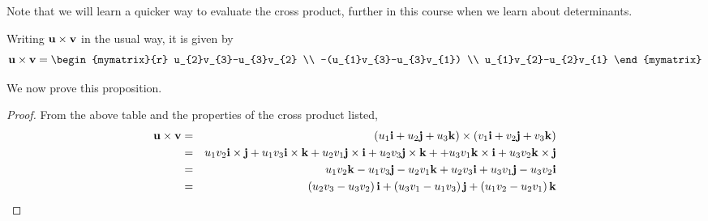 Note that we will learn a quicker way to evaluate the cross product, further in this course when we learn about determinants.

Writing ${\bf u} \times {\bf v}$ in the usual way, it is given by 
\begin{equation*}
\vect{u} \times \vect{v}
=
\begin{mymatrix}{r}
 u_{2}v_{3}-u_{3}v_{2} \\
-(u_{1}v_{3}-u_{3}v_{1}) \\
 u_{1}v_{2}-u_{2}v_{1}
\end{mymatrix}
\end{equation*}

We now prove this proposition. 

\begin{proof} From the above table and the properties of the cross
product listed,
\begin{eqnarray*}
{\bf u} \times {\bf v} &=& \left( u_{1}{\bf i}+u_{2}{\bf j}+u_{3}{\bf k}\right) \times \left(
v_{1}{\bf i}+v_{2}{\bf j}+v_{3}{\bf k}\right) \\
&=& u_{1}v_{2}{\bf i}\times {\bf j}+u_{1}v_{3}{\bf i}\times {\bf k}+u_{2}v_{1}{\bf j}\times {\bf i}+
u_{2}v_{3}{\bf j}\times {\bf k}+
+u_{3}v_{1}{\bf k}\times {\bf i}+u_{3}v_{2}{\bf k}\times {\bf j} \\
&=&u_{1}v_{2}{\bf k}-u_{1}v_{3}{\bf j}-u_{2}v_{1}{\bf k}+u_{2}v_{3}
{\bf i}+u_{3}v_{1}{\bf j}-u_{3}v_{2}{\bf i} \\
&=&\left( u_{2}v_{3}-u_{3}v_{2}\right) {\bf i}+\left(
u_{3}v_{1}-u_{1}v_{3}\right) {\bf j}+\left( u_{1}v_{2}-u_{2}v_{1}\right)
{\bf k}  
\end{eqnarray*}
\begin{equation}
\label{crossprod2}
\end{equation}
\end{proof}

